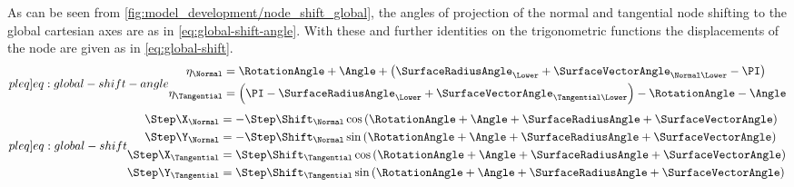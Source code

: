 As can be seen from \cref{fig:model_development/node_shift_global}, the angles of projection of the normal and tangential node shifting to the global cartesian axes are as in \cref{eq:global-shift-angle}.
With these and further identities on the trigonometric functions the displacements of the node are given as in \cref{eq:global-shift}.
\begin{subequations}
    \label[pleq]{eq:global-shift-angle}
    \begin{align}
        \eta_{\Normal} &= \RotationAngle + \Angle + \left( \SurfaceRadiusAngle_{\Lower} + \SurfaceVectorAngle_{\Normal\Lower} - \PI \right)
        \label{eq:global-shift-normal-angle} \\
        \eta_{\Tangential} &= \left( \PI - \SurfaceRadiusAngle_{\Lower} + \SurfaceVectorAngle_{\Tangential\Lower} \right) - \RotationAngle - \Angle
        \label{eq:global-shift-tangential-angle}
    \end{align}
\end{subequations}\vspace{-3ex}
\begin{subequations}
    \label[pleq]{eq:global-shift}
    \begin{align}
        \Step\X_{\Normal} &= -\Step\Shift_{\Normal} \cos \left( \RotationAngle + \Angle + \SurfaceRadiusAngle + \SurfaceVectorAngle \right)
        \label{eq:global-shift-normal-x} \\
        \Step\Y_{\Normal} &= -\Step\Shift_{\Normal} \sin \left( \RotationAngle + \Angle + \SurfaceRadiusAngle + \SurfaceVectorAngle \right)
        \label{eq:global-shift-normal-y} \\
        \Step\X_{\Tangential} &= \Step\Shift_{\Tangential} \cos \left( \RotationAngle + \Angle + \SurfaceRadiusAngle + \SurfaceVectorAngle \right)
        \label{eq:global-shift-tangential-x} \\
        \Step\Y_{\Tangential} &= \Step\Shift_{\Tangential} \sin \left( \RotationAngle + \Angle + \SurfaceRadiusAngle + \SurfaceVectorAngle \right)
        \label{eq:global-shift-tangential-y}
    \end{align}
\end{subequations}


